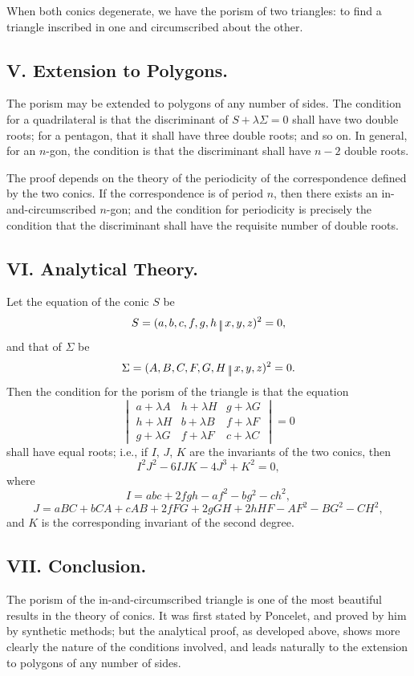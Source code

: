 \documentclass[11pt,a4paper]{article}
\theoremstyle{plain}
\begin{document}
When both conics degenerate, we have the porism of two triangles: to find a triangle inscribed in one and circumscribed about the other.

\subsection*{V. Extension to Polygons.}

The porism may be extended to polygons of any number of sides. The condition for a quadrilateral is that the discriminant of $S+\lambda\Sigma=0$ shall have two double roots; for a pentagon, that it shall have three double roots; and so on. In general, for an $n$-gon, the condition is that the discriminant shall have $n-2$ double roots.

The proof depends on the theory of the periodicity of the correspondence defined by the two conics. If the correspondence is of period $n$, then there exists an in-and-circumscribed $n$-gon; and the condition for periodicity is precisely the condition that the discriminant shall have the requisite number of double roots.

\subsection*{VI. Analytical Theory.}

Let the equation of the conic $S$ be
\[
S = (a,b,c,f,g,h\,\raisebox{-0.5ex}{\text{\textbardbl}}\,x,y,z)^2 = 0,
\]
and that of $\Sigma$ be
\[
\Sigma = (A,B,C,F,G,H\,\raisebox{-0.5ex}{\text{\textbardbl}}\,x,y,z)^2 = 0.
\]
Then the condition for the porism of the triangle is that the equation
\[
\begin{vmatrix}
a+\lambda A & h+\lambda H & g+\lambda G \\
h+\lambda H & b+\lambda B & f+\lambda F \\
g+\lambda G & f+\lambda F & c+\lambda C
\end{vmatrix} = 0
\]
shall have equal roots; i.e., if $I$, $J$, $K$ are the invariants of the two conics, then
\[
I^2J^2 - 6IJK - 4J^3 + K^2 = 0,
\]
where
\[
I = abc + 2fgh - af^2 - bg^2 - ch^2,
\]
\[
J = aBC + bCA + cAB + 2fFG + 2gGH + 2hHF - AF^2 - BG^2 - CH^2,
\]
and $K$ is the corresponding invariant of the second degree.

\subsection*{VII. Conclusion.}

The porism of the in-and-circumscribed triangle is one of the most beautiful results in the theory of conics. It was first stated by Poncelet, and proved by him by synthetic methods; but the analytical proof, as developed above, shows more clearly the nature of the conditions involved, and leads naturally to the extension to polygons of any number of sides.
\end{document}
